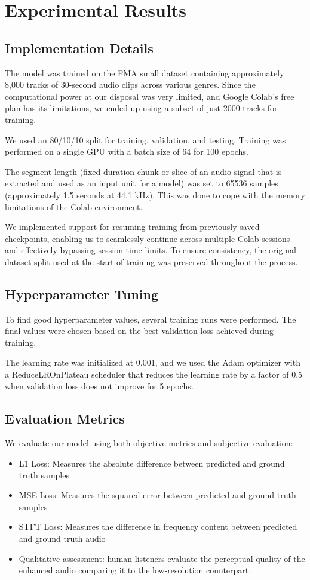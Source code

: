 \documentclass{article}
\begin{document}
\section{Experimental Results}

\subsection{Implementation Details}
The model was trained on the FMA small dataset containing approximately 8,000 tracks of 30-second audio clips across various genres.
Since the computational power at our disposal was very limited, and Google Colab's free plan has its limitations, we ended up using a subset of just 2000 tracks for training.

We used an 80/10/10 split for training, validation, and testing. Training was performed on a single GPU with a batch size of 64 for 100 epochs.

The segment length (fixed-duration chunk or slice of an audio signal that is extracted and used as an input unit for a model) was set to 65536 samples (approximately 1.5 seconds at 44.1 kHz).
This was done to cope with the memory limitations of the Colab environment.

We implemented support for resuming training from previously saved checkpoints, enabling us to seamlessly continue across multiple Colab sessions and effectively bypassing session time limits.
To ensure consistency, the original dataset split used at the start of training was preserved throughout the process.

\subsection{Hyperparameter Tuning}
To find good hyperparameter values, several training runs were performed.
The final values were chosen based on the best validation loss achieved during training.  

The learning rate was initialized at 0.001, and we used the Adam optimizer with a ReduceLROnPlateau scheduler that reduces the learning rate by a factor of 0.5 when validation loss does not improve for 5 epochs.

\subsection{Evaluation Metrics}
We evaluate our model using both objective metrics and subjective evaluation:
\begin{itemize}
    \item L1 Loss: Measures the absolute difference between predicted and ground truth samples
    \item MSE Loss: Measures the squared error between predicted and ground truth samples
    \item STFT Loss: Measures the difference in frequency content between predicted and ground truth audio
    \item Qualitative assessment: human listeners evaluate the perceptual quality of the enhanced audio comparing it to the low-resolution counterpart.
\end{itemize}
\end{document}
